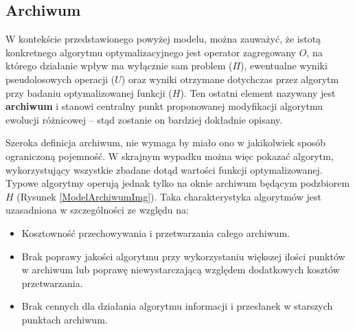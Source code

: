 \documentclass[12pt,a4paper]{report}
\begin{document}
{\subsection{Archiwum}
\label{ArchiveTheoryBase}
\par{
W kontekście przedstawionego powyżej modelu, można zauważyć, że istotą konkretnego algorytmu optymalizacyjnego jest operator zagregowany $O$, na którego działanie wpływ ma wyłącznie sam problem ($\Pi$), ewentualne wyniki pseudolosowych operacji ($U$) oraz wyniki otrzymane dotychczas przez algorytm przy badaniu optymalizowanej funkcji ($H$). Ten ostatni element nazywany jest \textbf{archiwum} i stanowi centralny punkt proponowanej modyfikacji algorytmu ewolucji różnicowej -- stąd zostanie on bardziej dokładnie opisany.
}
\par{
Szeroka definicja archiwum, nie wymaga by miało ono w jakikolwiek sposób ograniczoną pojemność. W skrajnym wypadku można więc pokazać algorytm, wykorzystujący wszystkie zbadane dotąd wartości funkcji optymalizowanej. Typowe algorytmy operują jednak tylko na oknie archiwum będącym podzbiorem $H$ (Rysunek \ref{ModelArchiwumImg}). Taka charakterystyka algorytmów jest uzasadniona w szczególności ze względu na:
\par{
	\begin{itemize}
		\item Kosztowność przechowywania i przetwarzania całego archiwum.
		\item Brak poprawy jakości algorytmu przy wykorzystaniu większej ilości punktów w archiwum lub poprawę niewystarczającą względem dodatkowych kosztów przetwarzania.
		\item Brak cennych dla działania algorytmu informacji i przesłanek w starszych punktach archiwum.
\end{itemize}
}

}}
\end{document}
